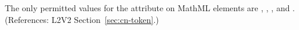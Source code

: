 The only permitted values for the  attribute on MathML
 elements are , , , and
.  (References: L2V2 Section~\ref{sec:cn-token}.)
